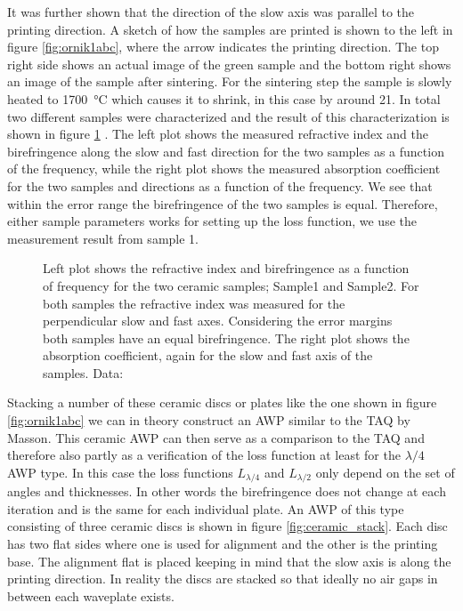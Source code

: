 It was further shown that the direction of the slow axis was parallel to the printing direction. A sketch of how the samples are printed is shown to the left in figure \ref{fig:ornik1abc}, where the arrow indicates the printing direction. The top right side shows an actual image of the green sample and the bottom right shows an image of the sample after sintering. For the sintering step the sample is slowly heated to \SI{1700}{\celsius} which causes it to shrink, in this case by around \SI{21}{\volpercent}. In total two different samples were characterized and the result of this characterization is shown in figure \ref{fig:ri_abs} \cite{Ornik2021}. The left plot shows the measured refractive index and the birefringence along the slow and fast direction for the two samples as a function of the frequency, while the right plot shows the measured absorption coefficient for the two samples and directions as a function of the frequency. We see that within the error range the birefringence of the two samples is equal. Therefore, either sample parameters works for setting up the loss function, we use the measurement result from sample 1. 

\begin{figure}[ht]
    \centering
    
    \caption{Left plot shows the refractive index and birefringence as a function of frequency for the two ceramic  samples; Sample1 and Sample2. For both samples the refractive index was measured for the perpendicular slow and fast axes. Considering the error margins both samples have an equal birefringence. The right plot shows the absorption coefficient, again for the slow and fast axis of the samples. Data: \cite{Ornik2021}}
    \label{fig:ri_abs}
\end{figure}

Stacking a number of these ceramic discs or plates like the one shown in figure \ref{fig:ornik1abc} we can in theory construct an AWP similar to the TAQ by Masson. This ceramic AWP can then serve as a comparison to the TAQ and therefore also partly as a verification of the loss function at least for the $\lambda/4$ AWP type. In this case the loss functions $L_{\lambda/4}$ and $L_{\lambda/2}$ only depend on the set of angles and thicknesses. In other words the birefringence does not change at each iteration and is the same for each individual plate. An AWP of this type consisting of three ceramic discs is shown in figure \ref{fig:ceramic_stack}. Each disc has two flat sides where one is used for alignment and the other is the printing base. The alignment flat is placed keeping in mind that the slow axis is along the printing direction. In reality the discs are stacked so that ideally no air gaps in between each waveplate exists.

